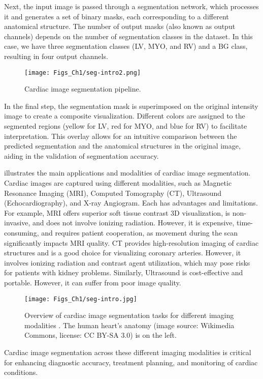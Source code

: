 Next, the input image is passed through a segmentation network, which processes it and generates a set of binary masks, each corresponding to a different anatomical structure. The number of output masks (also known as output channels) depends on the number of segmentation classes in the dataset. In this case, we have three segmentation classes (LV, MYO, and RV) and a BG class, resulting in four output channels.
\begin{figure}[t!]
\centering
\texttt{[image: Figs\_Ch1/seg-intro2.png]}
\caption{Cardiac image segmentation pipeline.}
\label{fig1_3}
\end{figure}
In the final step, the segmentation mask is superimposed on the original intensity image to create a composite visualization. Different colors are assigned to the segmented regions (yellow for LV, red for MYO, and blue for RV) to facilitate interpretation. This overlay allows for an intuitive comparison between the predicted segmentation and the anatomical structures in the original image, aiding in the validation of segmentation accuracy.


 illustrates the main applications and modalities of cardiac image segmentation.
Cardiac images are captured using different modalities, such as Magnetic Resonance Imaging (MRI), Computed Tomography (CT), Ultrasound (Echocardiography), and X-ray Angiogram. Each has advantages and limitations. For example, MRI   offers superior soft tissue contrast 3D visualization, is non-invasive, and does not involve ionizing radiation. However, it is expensive, time-consuming, and requires patient cooperation, as movement during the scan significantly impacts MRI quality. CT provides high-resolution imaging of cardiac structures and is a good choice for visualizing coronary arteries. However, it involves ionizing radiation and contrast agent utilization, which may pose risks for patients with kidney problems. Similarly, Ultrasound is cost-effective and portable. However, it can suffer from poor image quality. 
\begin{figure}[t!]
\centering
\texttt{[image: Figs\_Ch1/seg-intro.jpg]}
\caption{Overview of cardiac image segmentation tasks for different imaging modalities \cite{chen2020deep}. The human heart's anatomy (image source: Wikimedia Commons, license: CC BY-SA 3.0) is on the left.}
\label{fig1_4}
\end{figure}
Cardiac image segmentation across these different imaging modalities is critical for enhancing diagnostic accuracy, treatment planning, and monitoring of cardiac conditions. 

